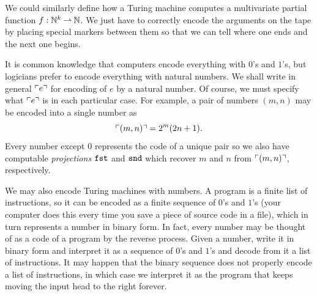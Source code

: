 We could similarly define how a Turing machine computes a multivariate
partial function $f : \mathbb{N}^k \mathbin{\rightharpoonup} \mathbb{N}$. We just have to correctly
encode the arguments on the tape by placing special markers between
them so that we can tell where one ends and the next one begins.

It is common knowledge that computers encode everything with $0$'s and
$1$'s, but logicians prefer to encode everything with natural numbers.
We shall write in general $\ulcorner e \urcorner$ for encoding of $e$ by a natural
number. Of course, we must specify what $\ulcorner e \urcorner$ is in each
particular case. For example, a pair of numbers $(m, n)$ may be
encoded into a single number as
%
\begin{equation*}
  \ulcorner (m, n) \urcorner = 2^m (2 n + 1).
\end{equation*}
%
Every number except $0$ represents the code of a unique pair so we
also have computable \emph{projections} $\mathtt{fst}$ and $\mathtt{snd}$ which
recover $m$ and $n$ from $\ulcorner (m, n) \urcorner$, respectively.

We may also encode Turing machines with numbers. A program is a finite
list of instructions, so it can be encoded as a finite sequence of
$0$'s and $1$'s (your computer does this every time you save a piece of
source code in a file), which in turn represents a number in binary
form. In fact, every number may be thought of as a code of a program
by the reverse process. Given a number, write it in binary form and
interpret it as a sequence of $0$'s and $1$'s and decode from it a
list of instructions. It may happen that the binary sequence does not
properly encode a list of instructions, in which case we interpret it
as the program that keeps moving the input head to the right forever.

